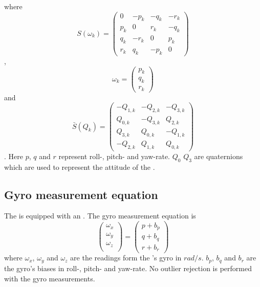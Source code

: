 where
\begin{equation}
S(\omega_{k}) = \begin{pmatrix}
    0 & -p_{k} & -q_{k} & -r_{k} \\
     p_{k} & 0 & r_{k} & -q_{k} \\
     q_{k} & -r_{k} & 0 & p_{k} \\
     r_{k} & q_{k} & -p_{k} &0
\end{pmatrix}
\end{equation},
\begin{equation}
\omega_{k} = \begin{pmatrix}
p_{k}\\
q_{k}\\
r_{k}
\end{pmatrix}
\end{equation}
and
\begin{equation}
\bar{S}(Q_{k}) = \begin{pmatrix}
    -Q_{1,k} & -Q_{2,k} & -Q_{3,k}\\
    Q_{0,k} & -Q_{3,k} &  Q_{2,k}\\
    Q_{3,k} &  Q_{0,k} & -Q_{1,k}\\
    -Q_{2,k} & Q_{1,k} &  Q_{0,k}
\end{pmatrix}
\end{equation}. Here $p$, $q$ and $r$ represent roll-, pitch- and yaw-rate. $Q_0$ \rightarrow $Q_3$ are quaternions which are used to represent the attitude of the \abbROV.


\subsection{Gyro measurement equation}
The \abbrROV is equipped with an \abbrIMU. The gyro measurement equation is 
\begin{equation}
\begin{pmatrix}
\omega_x\\
\omega_y\\
\omega_z\\
\end{pmatrix}= \begin{pmatrix}
p + b_p\\
q + b_q\\
r + b_r
\end{pmatrix}
\end{equation}
where $\omega_x$, $\omega_y$ and $\omega_z$ are the readings form the \abbrIMU's gyro in $rad/s$. $b_p$, $b_q$ and $b_r$ are the gyro's biases in roll-, pitch- and yaw-rate. No outlier rejection is performed with the gyro measurements.

